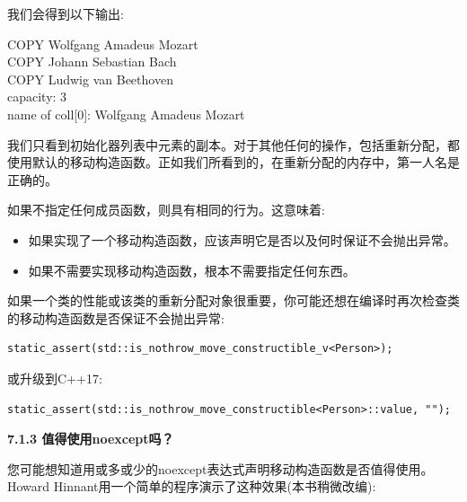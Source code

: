 我们会得到以下输出:\par

\begin{tcolorbox}[colback=white,colframe=black]
COPY Wolfgang Amadeus Mozart \\
COPY Johann Sebastian Bach \\
COPY Ludwig van Beethoven \\
capacity: 3 \\
name of coll[0]: Wolfgang Amadeus Mozart
\end{tcolorbox}

我们只看到初始化器列表中元素的副本。对于其他任何的操作，包括重新分配，都使用默认的移动构造函数。正如我们所看到的，在重新分配的内存中，第一人名是正确的。\par

如果不指定任何成员函数，则具有相同的行为。这意味着:\par

\begin{itemize}
	\item 如果实现了一个移动构造函数，应该声明它是否以及何时保证不会抛出异常。
	\item 如果不需要实现移动构造函数，根本不需要指定任何东西。
\end{itemize}

如果一个类的性能或该类的重新分配对象很重要，你可能还想在编译时再次检查类的移动构造函数是否保证不会抛出异常:\par

\begin{lstlisting}[caption={}]
static_assert(std::is_nothrow_move_constructible_v<Person>);
\end{lstlisting}

或升级到C++17:\par

\begin{lstlisting}[caption={}]
static_assert(std::is_nothrow_move_constructible<Person>::value, "");
\end{lstlisting}

\hspace*{\fill} \par %
\textbf{7.1.3 值得使用noexcept吗？}

您可能想知道用或多或少的noexcept表达式声明移动构造函数是否值得使用。Howard Hinnant用一个简单的程序演示了这种效果(本书稍微改编):\par

{\color{red}{basics/movenoexcept.cpp}}\par

